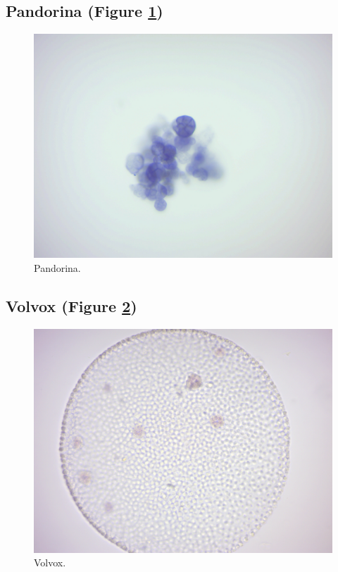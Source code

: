 \subsection{Pandorina (Figure
\ref{fig:pandorinadead})}\label{pandorina-figure-reffigpandorinadead}

\begin{figure}

{\centering \includegraphics[width=0.7\linewidth]{./figures/protists/pandorinadead}

}

\caption{Pandorina.}\label{fig:pandorinadead}
\end{figure}

\subsection{Volvox (Figure
\ref{fig:volvoxdead})}\label{volvox-figure-reffigvolvoxdead}

\begin{figure}

{\centering \includegraphics[width=0.7\linewidth]{./figures/protists/volvox_dead}

}

\caption{Volvox.}\label{fig:volvoxdead}
\end{figure}

